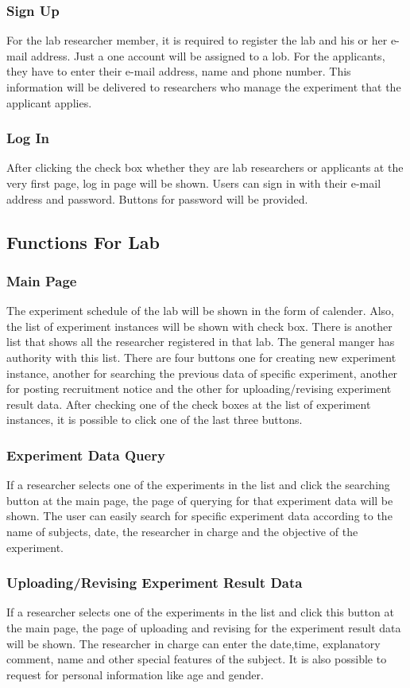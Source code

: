 \documentclass[letterpaper, 10 pt, conference]{ieeeconf}  %
\begin{document}
\subsubsection{Sign Up}
For the lab researcher member, it is required to register the lab and his or her e-mail address. Just a one account will be assigned to a lob. For the applicants, they have to enter their e-mail address, name and phone number. This information will be delivered to researchers who manage the experiment that the applicant applies. 
\subsubsection{Log In}
After clicking the check box whether they are lab researchers or applicants at the very first page, log in page will be shown. Users can sign in with their e-mail address and password. Buttons for password will be provided.


\subsection{Functions For Lab}

\subsubsection{Main Page}
The experiment schedule of the lab will be shown in the form of calender. Also, the list of experiment instances will be shown with check box. There is another list that shows all the researcher registered in that lab. The general manger has authority with this list. There are four buttons one for creating new experiment instance, another for searching the previous data of specific experiment, another for posting recruitment notice and the other for uploading/revising experiment result data. 
After checking one of the check boxes at the list of experiment instances, it is possible to click one of the last three buttons. 
\subsubsection{Experiment Data Query}
If a researcher selects one of the experiments in the list and click the searching button at the main page, the page of querying for that experiment data will be shown. The user can easily search for specific experiment data according to the name of subjects, date, the researcher in charge and the objective of the experiment. 
\subsubsection{Uploading/Revising Experiment Result Data}
If a researcher selects one of the experiments in the list and click this button at the main page, the page of uploading and revising for the experiment result data will be shown. The researcher in charge can enter the date,time, explanatory comment, name and other special features of the subject. It is also possible to request for personal information like age and gender. 
\end{document}
